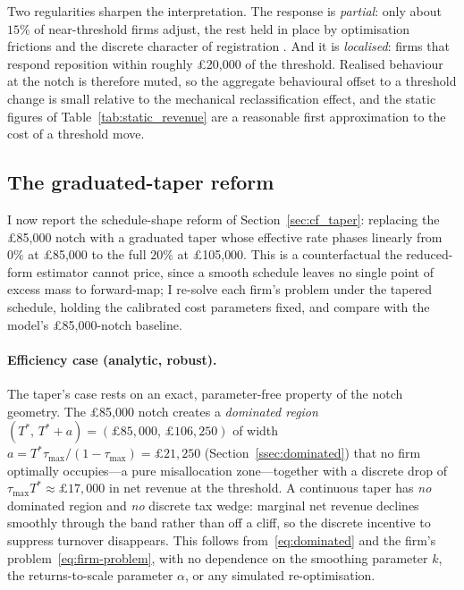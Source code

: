 Two regularities sharpen the interpretation. The response is \emph{partial}: only
about $15\%$ of near-threshold firms adjust, the rest held in place by
optimisation frictions and the discrete character of registration
\citep{chettyetal2011}. And it is \emph{localised}: firms that respond reposition
within roughly \pounds20{,}000 of the threshold. Realised behaviour at the notch
is therefore muted, so the aggregate behavioural offset to a threshold change is
small relative to the mechanical reclassification effect, and the static figures
of Table~\ref{tab:static_revenue} are a reasonable first approximation to the cost
of a threshold move.

\subsection{The graduated-taper reform}
\label{sec:results_taper}

I now report the schedule-shape reform of Section~\ref{sec:cf_taper}: replacing
the \pounds85{,}000 notch with a graduated taper whose effective rate phases
linearly from $0\%$ at \pounds85{,}000 to the full $20\%$ at \pounds105{,}000.
This is a counterfactual the reduced-form estimator cannot price, since a smooth
schedule leaves no single point of excess mass to forward-map; I re-solve each
firm's problem under the tapered schedule, holding the calibrated cost parameters
fixed, and compare with the model's \pounds85{,}000-notch baseline.

\paragraph{Efficiency case (analytic, robust).} The taper's case rests on an
exact, parameter-free property of the notch geometry. The \pounds85{,}000 notch
creates a \emph{dominated region} $(T^{*},\,T^{*}+a)=(\pounds85{,}000,\,
\pounds106{,}250)$ of width $a=T^{*}\tau_{\max}/(1-\tau_{\max})=\pounds21{,}250$
(Section~\ref{ssec:dominated}) that no firm optimally occupies---a pure
misallocation zone---together with a discrete drop of
$\tau_{\max}T^{*}\approx\pounds17{,}000$ in net revenue at the threshold. A
continuous taper has \emph{no} dominated region and \emph{no} discrete tax wedge:
marginal net revenue declines smoothly through the band rather than off a cliff,
so the discrete incentive to suppress turnover disappears. This follows
from~\eqref{eq:dominated} and the firm's problem~\eqref{eq:firm-problem}, with no
dependence on the smoothing parameter $k$, the returns-to-scale parameter
$\alpha$, or any simulated re-optimisation.

